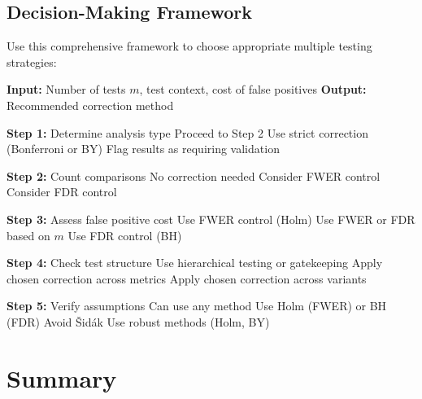 \subsection{Decision-Making Framework}

Use this comprehensive framework to choose appropriate multiple testing strategies:

\begin{algorithm}[H]
\caption{Multiple Testing Strategy Selection}
\begin{algorithmic}
\STATE \textbf{Input:} Number of tests $m$, test context, cost of false positives
\STATE \textbf{Output:} Recommended correction method

\STATE \textbf{Step 1:} Determine analysis type
    \STATE Proceed to Step 2
    \STATE Use strict correction (Bonferroni or BY)
    \STATE Flag results as requiring validation
    \RETURN
\ENDIF

\STATE \textbf{Step 2:} Count comparisons
    \STATE No correction needed
    \RETURN
{}
    \STATE Consider FWER control
    \STATE Consider FDR control
\ENDIF

\STATE \textbf{Step 3:} Assess false positive cost
    \STATE Use FWER control (Holm)
    \STATE Use FWER or FDR based on $m$
    \STATE Use FDR control (BH)
\ENDIF

\STATE \textbf{Step 4:} Check test structure
    \STATE Use hierarchical testing or gatekeeping
    \STATE Apply chosen correction across metrics
    \STATE Apply chosen correction across variants
\ENDIF

\STATE \textbf{Step 5:} Verify assumptions
    \STATE Can use any method
    \STATE Use Holm (FWER) or BH (FDR)
    \STATE Avoid Šidák
    \STATE Use robust methods (Holm, BY)
\ENDIF
\end{algorithmic}
\end{algorithm}

\section{Summary}

